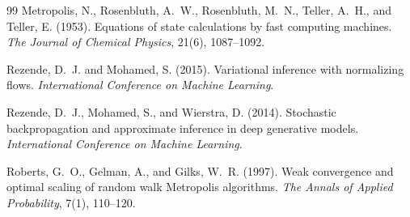 \documentclass[12pt,a4paper]{article}
\begin{document}
\begin{thebibliography}{99}
Metropolis, N., Rosenbluth, A.~W., Rosenbluth, M.~N., Teller, A.~H., and Teller, E. (1953).
Equations of state calculations by fast computing machines.
\textit{The Journal of Chemical Physics}, 21(6), 1087--1092.

Rezende, D.~J. and Mohamed, S. (2015).
Variational inference with normalizing flows.
\textit{International Conference on Machine Learning}.

Rezende, D.~J., Mohamed, S., and Wierstra, D. (2014).
Stochastic backpropagation and approximate inference in deep generative models.
\textit{International Conference on Machine Learning}.

Roberts, G.~O., Gelman, A., and Gilks, W.~R. (1997).
Weak convergence and optimal scaling of random walk Metropolis algorithms.
\textit{The Annals of Applied Probability}, 7(1), 110--120.

\end{thebibliography}
\end{document}
